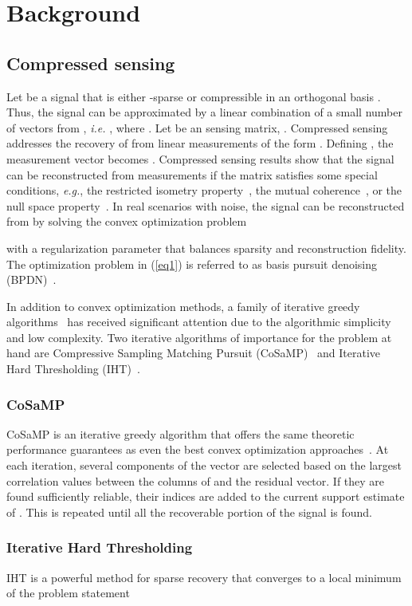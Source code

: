 \documentclass[journal]{IEEEtran}
\begin{document}
\section{Background}
\subsection{Compressed sensing}
Let  be a signal that is either
-sparse or compressible in an orthogonal basis . Thus, the signal  can be approximated by a linear combination of a small number of vectors from , \textit{i.e.} , where . Let  be an  sensing matrix, . Compressed sensing~\cite{Dono06, Cand08} addresses the recovery of  from linear measurements of the form . Defining , the measurement vector becomes . Compressed sensing results show that the signal  can be reconstructed from  measurements if the matrix  satisfies some special conditions, \textit{e.g.}, the restricted isometry property~\cite{Cand08}, the mutual coherence~\cite{Bruc09}, or the null space property~\cite{Dono06}. In real scenarios with noise, the signal  can be reconstructed from  by solving the convex optimization problem


with   a regularization parameter that balances sparsity and reconstruction fidelity. The optimization problem in (\ref{eq1}) is referred to as basis pursuit denoising (BPDN)~\cite{Chen98}.

In addition to  convex optimization methods, a family of iterative greedy algorithms~\cite{Trop07,Need08,Need09} has received significant attention due to the algorithmic simplicity and low complexity. Two iterative algorithms of importance for the problem at hand are Compressive Sampling Matching Pursuit (CoSaMP)~\cite{Need08} and Iterative Hard Thresholding (IHT)~\cite{Blum09}.

\subsubsection{CoSaMP}
 CoSaMP is an iterative greedy algorithm that offers the same theoretic performance guarantees as even the best convex optimization approaches~\cite{Need08}. At each iteration, several components of the vector  are selected based on the largest correlation values between the columns of  and the residual vector. If they are found sufficiently reliable, their indices are added to the current support estimate of . This is repeated until all the recoverable portion of the signal is found.
 \subsubsection{Iterative Hard Thresholding}
IHT is a powerful method for sparse recovery that converges to a local minimum of the problem statement
\end{document}
